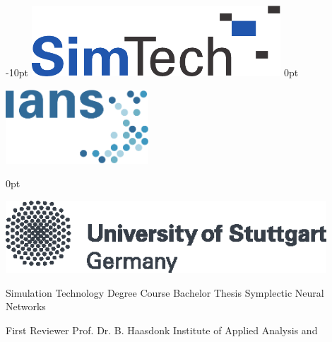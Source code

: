\documentclass[twoside,a4paper]{article}
\begin{document}
%
%
\begin{titlePageST}
\makeLogo%
{-10pt}{
\includegraphics[width=0.7\textwidth]{figures/logos/simtech.pdf}
}%
{0pt}{
	\begin{center}
		\includegraphics[width=0.4\textwidth]{figures/logos/ians.pdf}
	\end{center}}%
{0pt}{
\begin{flushright}
	\vspace{-10pt}
	\includegraphics[width=0.9\textwidth]{figures/logos/unistuttgart_logo_englisch_cmyk.eps}
\end{flushright}}%
\vspace{35pt}%
\vspace{50pt}%
\makeTitle%
{Simulation Technology Degree Course} %
{Bachelor Thesis} %
\vspace{80pt}%
\makeTitleThesis%
{Symplectic Neural Networks}
\vspace{90pt}%
\begin{supervisorST}{3}%
\addSuper%
{First Reviewer}%
{Prof. Dr. B. Haasdonk}%
{Institute of Applied Analysis and\\[-0.2cm]
}
\end{supervisorST}
\end{titlePageST}
\end{document}
